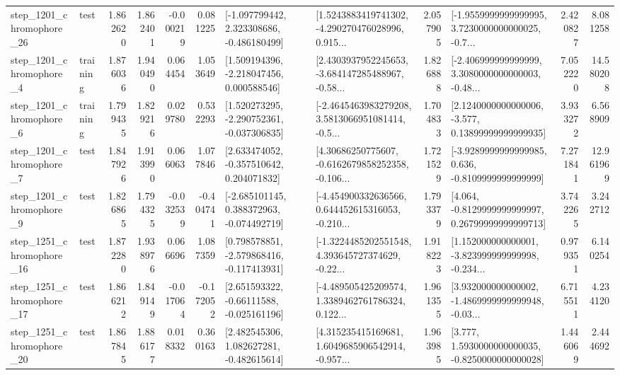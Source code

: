 \begin{tabular}{llrrrrllrlrr}
 step\_1201\_chromophore\_26 &      test &      1.862620 &    1.862401 &     -0.000219 &  0.081225 &   [-1.097799442, 2.323308686, -0.486180499] &  [1.5243883419741302, -4.290270476028996, 0.915... &       2.057905 &  [-1.9559999999999995, 3.7230000000000025, -0.7... &            2.420827 &          8.081258 \\
  step\_1201\_chromophore\_4 &  training &      1.876036 &    1.940490 &      0.064454 &  1.053649 &    [1.509194396, -2.218047456, 0.000588546] &  [2.4303937952245653, -3.684147285488967, -0.58... &       1.826888 &  [-2.406999999999999, 3.3080000000000003, -0.48... &            7.052220 &         14.580208 \\
  step\_1201\_chromophore\_6 &  training &      1.799435 &    1.829216 &      0.029780 &  0.532293 &   [1.520273295, -2.290752361, -0.037306835] &  [-2.4645463983279208, 3.5813066951081414, -0.5... &       1.704833 &  [2.1240000000000006, -3.577, 0.13899999999999935] &            3.933272 &          6.568909 \\
  step\_1201\_chromophore\_7 &      test &      1.847926 &    1.913990 &      0.066063 &  1.077846 &    [2.633474052, -0.357510642, 0.204071832] &  [4.30686250775607, -0.6162679858252358, -0.106... &       1.721529 &  [-3.9289999999999985, 0.636, -0.8109999999999999] &            7.271841 &         12.961969 \\
  step\_1201\_chromophore\_9 &      test &      1.826865 &    1.794325 &     -0.032539 & -0.404741 &   [-2.685101145, 0.388372963, -0.074492719] &  [-4.454900332636566, 0.644452615316053, -0.210... &       1.793379 &  [4.064, -0.8129999999999997, 0.26799999999999713] &            3.742265 &          3.242712 \\
 step\_1251\_chromophore\_16 &      test &      1.872280 &    1.938976 &      0.066696 &  1.087359 &   [0.798578851, -2.579868416, -0.117413931] &  [-1.3224485202551548, 4.393645727374629, -0.22... &       1.918223 &  [1.152000000000001, -3.823999999999998, -0.234... &            0.979351 &          6.140254 \\
 step\_1251\_chromophore\_17 &      test &      1.866212 &    1.849149 &     -0.017064 & -0.172052 &    [2.651593322, -0.66111588, -0.025161196] &  [-4.489505425209574, 1.3389462761786324, 0.122... &       1.961355 &  [3.932000000000002, -1.4869999999999948, -0.03... &            6.715511 &          4.234120 \\
 step\_1251\_chromophore\_20 &      test &      1.867845 &    1.886177 &      0.018332 &  0.360163 &    [2.482545306, 1.082627281, -0.482615614] &  [4.315235415169681, 1.6049685906542914, -0.957... &       1.963985 &   [3.777, 1.5930000000000035, -0.8250000000000028] &            1.446069 &          2.444692 \\

\end{tabular}
